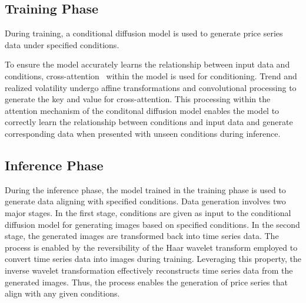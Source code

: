 \documentclass{article}
\newcommand{\takehiro}[1]{\textcolor{black}{#1}}
\begin{document}
\subsection{Training Phase}\label{Sec:training_phase}

During training, a conditional diffusion model is used to generate price series data under specified conditions. 

To ensure the model accurately learns the relationship between input data and conditions, cross-attention~\cite{rombach2022high} within the model is used for conditioning. Trend and realized volatility undergo affine transformations and convolutional processing to generate the key and value for cross-attention. This processing within the attention mechanism of the conditonal diffusion model enables the model to correctly learn the relationship between conditions and input data and generate corresponding data when presented with unseen conditions during inference.



\subsection{Inference Phase}\label{Sec:inference_phase}

During the inference phase, the model trained in the training phase is used to generate data aligning with specified conditions. Data generation involves two major stages. In the first stage, conditions are given as input to the conditional diffusion model for generating images based on specified conditions. 
In the second stage, the generated images are transformed back into time series data. The process is enabled by the reversibility of the Haar wavelet transform employed to convert time series data into images during training. Leveraging this property, the inverse wavelet transformation effectively reconstructs time series data from the generated images.
Thus, the process enables the generation of price series that align with any given conditions.
\end{document}
